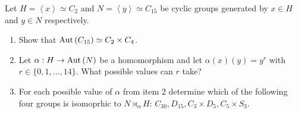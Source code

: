 \documentclass[a4paper]{article}
\begin{document}
\newpage
\begin{problem}[3]
	Let \(H = \left<x \right>  \simeq C_2\) and \(N = \left<y \right> \simeq C_{15}\) be cyclic groups generated by \(x \in H\) and \(y \in N\) respectively.
	\begin{enumerate}
		\item Show that \(\operatorname{Aut}\left( C_{15} \right) \simeq C_2 \times C_4 \).
		\item Let \(\alpha: H \to \operatorname{Aut} \left( N \right) \) be a homomorphism and let \(\alpha\left( x \right) \left( y \right)  = y^{r}\) with \(r \in \{ 0, 1, \ldots, 14\} \). What possible values can \(r\) take?
			\item For each possible value of \(\alpha\) from item \(2\) determine which of the following four groups is isomoprhic to \(N \rtimes_{\alpha} H\): \(C_{30}, D_{15}, C_3 \times D_5, C_5 \times S_3\).
	\end{enumerate}
\end{problem}
\end{document}
